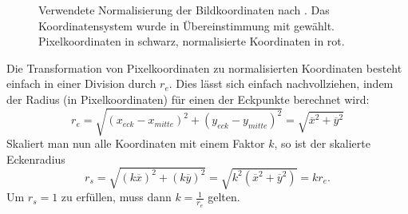 \begin{figure}[h]
	\centering
	
	\caption{Verwendete Normalisierung der Bildkoordinaten nach \cite{imatest, lensfun}. Das Koordinatensystem wurde in Übereinstimmung mit \cite[S. 359]{pbrt_book} gewählt. Pixelkoordinaten in schwarz, normalisierte Koordinaten in rot.	\label{fig:normalisation}}
	\label{fig:norm}
\end{figure}

Die Transformation von Pixelkoordinaten zu normalisierten Koordinaten besteht einfach in einer Division durch $r_e$. Dies lässt sich einfach nachvollziehen, indem der Radius (in Pixelkoordinaten) für einen der Eckpunkte berechnet wird:
\begin{equation}
	r_e = \sqrt{(x_{eck} - x_{mitte})^2 + (y_{eck} - y_{mitte})^2} = \sqrt{\overline{x}^2 + \overline{y}^2}
\end{equation}
Skaliert man nun alle Koordinaten mit einem Faktor $k$, so ist der skalierte Eckenradius
\begin{equation}
	r_s = \sqrt{(k \overline{x})^2 + (k \overline{y})^2} = \sqrt{k^2 (\overline{x}^2 + \overline{y}^2)} = k r_e.
\end{equation}
Um $r_s = 1$ zu erfüllen, muss dann $k = \frac{1}{r_e}$ gelten.

